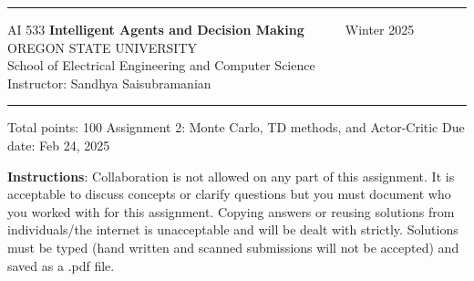 \documentclass[11pt]{article}
\begin{document}
	
	\begin{center}
		\rule{7.3in}{2pt}
		{\large AI 533 \hfill {\bf Intelligent Agents and Decision Making~~~~~} \hfill Winter 2025}\\[2pt]
		OREGON STATE UNIVERSITY\\
		School of Electrical Engineering and Computer Science \\ [2pt]
		Instructor: Sandhya Saisubramanian\\
		\rule{7.3in}{2pt}
	\end{center}
	
	\vskip 0.2in
	\begin{center}
	\large Total points: 100 \hfill	{\large Assignment 2: Monte Carlo, TD methods, and Actor-Critic} \hfill \large Due date: Feb 24, 2025
	\end{center}
	
	\vskip 0.2in
	
	\thispagestyle{empty}
	
	\textbf{Instructions}: Collaboration is not allowed on any part of this assignment. It is acceptable to discuss concepts or clarify questions but you must document who you worked with for this assignment. Copying answers or reusing solutions from individuals/the internet is unacceptable and will be dealt with strictly. 
	Solutions must be typed (hand written and scanned submissions will not be accepted) and saved as a .pdf file. 
	
\end{document}
